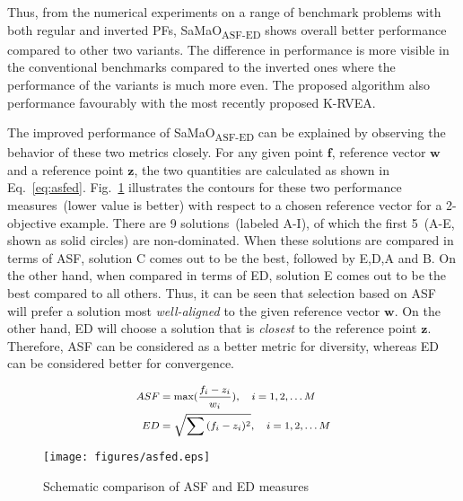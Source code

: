 {\color{blue} Thus, from the numerical experiments on a range of benchmark problems with both regular and inverted PFs, SaMaO\textsubscript{ASF-ED} shows overall better performance compared to other two variants. The difference in performance is more visible in the conventional benchmarks compared to the inverted ones where the performance of the variants is much more even. The proposed algorithm also performance favourably with the most recently proposed K-RVEA. }

The improved performance of SaMaO\textsubscript{ASF-ED} can be explained by observing the behavior of these two metrics closely. For any given point $\mathbf{f}$, reference vector $\mathbf{w}$ and a reference point $\mathbf{z}$, the two quantities are calculated as shown in Eq.~\ref{eq:asfed}. {\color{blue}Fig.~\ref{fig:compareasfed}} illustrates the contours for these two performance measures~(lower value is better) with respect to a chosen reference vector for a 2-objective example. There are 9 solutions~(labeled A-I), of which the first 5~(A-E, shown as solid circles) are non-dominated. When these solutions are compared in terms of ASF, solution C comes out to be the best, followed by E,D,A and B. On the other hand, when compared in terms of ED, solution E comes out to be the best compared to all others. Thus, it can be seen that selection based on ASF will prefer a solution most \emph{well-aligned} to the given reference vector $\mathbf{w}$. On the other hand, ED will choose a solution that is \emph{closest} to the reference point $\mathbf{z}$. Therefore, ASF can be considered as a better metric for diversity, whereas ED can be considered better for convergence. 

\begin{equation}\footnotesize
\begin{aligned}
ASF & = \text{max}(\frac{f_i-z_i}{w_i}), \quad i=1,2,\ldots M\\
ED & = \sqrt{\sum{(f_i-z_i)^2}}, \quad i=1,2,\ldots M\\
\end{aligned}
\label{eq:asfed}
\end{equation}

\begin{figure}[!htb]
	\centering    
	\texttt{[image: figures/asfed.eps]}   
	\caption{Schematic comparison of ASF and ED measures}
	\label{fig:compareasfed}
\end{figure}

